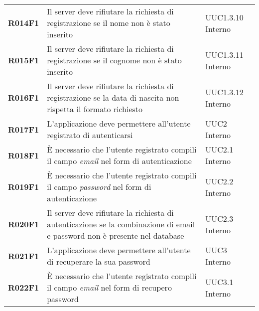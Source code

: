 \documentclass[../analisi-dei-requisiti.tex]{subfiles}
\begin{document}
\begin{longtable}[H]{>{\centering\bfseries}m{3cm} >{\centering}m{10cm} >{\centering\arraybackslash}m{3cm}}
  R014F1                               & Il server deve rifiutare la richiesta di registrazione se il nome non è stato inserito                                                                                                                  & UUC1.3.10 Interno             \\
  R015F1                               & Il server deve rifiutare la richiesta di registrazione se il cognome non è stato inserito                                                                                                               & UUC1.3.11 Interno             \\
  R016F1                               & Il server deve rifiutare la richiesta di registrazione se la data di nascita non rispetta il formato richiesto                                                                                          & UUC1.3.12 Interno              \\
  R017F1                               & L'applicazione deve permettere all'utente registrato di autenticarsi                                                                                                                                    & UUC2 Interno                  \\
  R018F1                               & È necessario che l'utente registrato compili il campo \textit{email} nel form di autenticazione                                                                                                         & UUC2.1 Interno                \\
  R019F1                               & È necessario che l'utente registrato compili il campo \textit{password} nel form di autenticazione                                                                                                      & UUC2.2 Interno                \\
  R020F1                               & Il server deve rifiutare la richiesta di autenticazione se la combinazione di email e password non è presente nel database                                                                              & UUC2.3 Interno                \\
  R021F1                               & L'applicazione deve permettere all'utente di recuperare la sua password                                                                                                                                 & UUC3 Interno                  \\
  R022F1                               & È necessario che l'utente registrato compili il campo \textit{email} nel form di recupero password                                                                                                      & UUC3.1 Interno                \\

\end{longtable}
\end{document}
